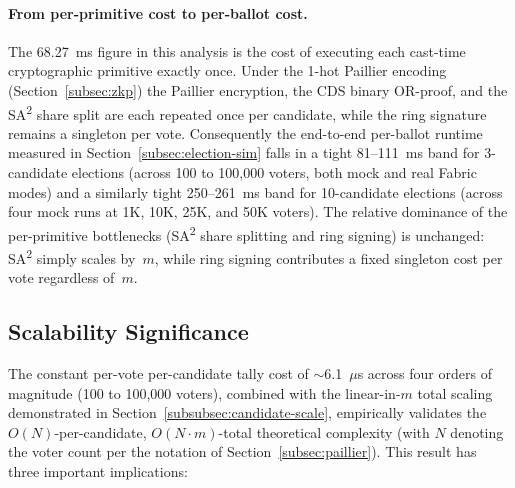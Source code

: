 \paragraph{From per-primitive cost to per-ballot cost.} The 68.27~ms figure in this analysis is the cost of executing each cast-time cryptographic primitive exactly once. Under the 1-hot Paillier encoding (Section~\ref{subsec:zkp}) the Paillier encryption, the CDS binary OR-proof, and the SA\textsuperscript{2} share split are each repeated once per candidate, while the ring signature remains a singleton per vote. Consequently the end-to-end per-ballot runtime measured in Section~\ref{subsec:election-sim} falls in a tight 81--111~ms band for 3-candidate elections (across 100 to 100{,}000 voters, both mock and real Fabric modes) and a similarly tight 250--261~ms band for 10-candidate elections (across four mock runs at 1K, 10K, 25K, and 50K voters). The relative dominance of the per-primitive bottlenecks (SA\textsuperscript{2} share splitting and ring signing) is unchanged: SA\textsuperscript{2} simply scales by~$m$, while ring signing contributes a fixed singleton cost per vote regardless of~$m$.

\subsection{Scalability Significance}
\label{subsec:scale-significance}

The constant per-vote per-candidate tally cost of $\sim$6.1~$\mu$s across four orders of magnitude (100 to 100{,}000 voters), combined with the linear-in-$m$ total scaling demonstrated in Section~\ref{subsubsec:candidate-scale}, empirically validates the $O(N)$-per-candidate, $O(N \cdot m)$-total theoretical complexity (with $N$ denoting the voter count per the notation of Section~\ref{subsec:paillier}). This result has three important implications:

